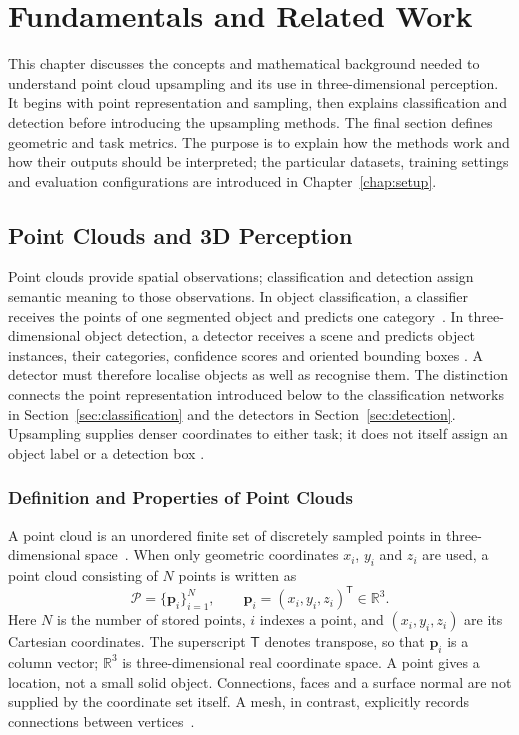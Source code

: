 \chapter{Fundamentals and Related Work}
\label{chap:fundamentals}

This chapter discusses the concepts and mathematical background needed to
understand point cloud upsampling and its use in three-dimensional
perception. It begins with point representation and sampling, then explains
classification and detection before introducing the upsampling methods.
The final section defines geometric and task metrics. The purpose is to
explain how the methods work and how their outputs should be interpreted;
the particular datasets, training settings and evaluation configurations
are introduced in Chapter~\ref{chap:setup}.

\section{Point Clouds and 3D Perception}
\label{sec:point_clouds}

Point clouds provide spatial observations; classification and detection
assign semantic meaning to those observations. In object classification,
a classifier receives the points of one segmented object and predicts one
category~\cite{qi2017pointnet}. In three-dimensional object detection, a
detector receives a scene and predicts object instances, their categories,
confidence scores and oriented bounding boxes
\cite{shi2019pointrcnn,yin2021centerpoint}. A detector must therefore
localise objects as well as recognise them. The distinction connects the
point representation introduced below to the classification networks in
Section~\ref{sec:classification} and the detectors in
Section~\ref{sec:detection}. Upsampling supplies denser coordinates to
either task; it does not itself assign an object label or a detection box
\cite{yu2018punet,qian2021pugcn}.

\subsection{Definition and Properties of Point Clouds}
\label{subsec:pc_definition}

A point cloud is an unordered finite set of discretely sampled points in
three-dimensional space~\cite{qi2017pointnet}. When only geometric
coordinates $x_i$, $y_i$ and $z_i$ are used, a point cloud consisting
of $N$ points is written as
\begin{equation}
  \mathcal P=\{\mathbf p_i\}_{i=1}^N,
  \qquad \mathbf p_i=(x_i,y_i,z_i)^{\mathsf T}\in\mathbb R^3.
  \label{eq:pointcloud}
\end{equation}
Here $N$ is the number of stored points, $i$ indexes a point, and
$(x_i,y_i,z_i)$ are its Cartesian coordinates. The superscript
$\mathsf T$ denotes transpose, so that $\mathbf p_i$ is a column vector;
$\mathbb R^3$ is three-dimensional real coordinate space. A point gives a
location, not a small solid object. Connections, faces and a surface normal
are not supplied by the coordinate set itself. A mesh, in contrast,
explicitly records connections between vertices~\cite{qi2017pointnet}.

